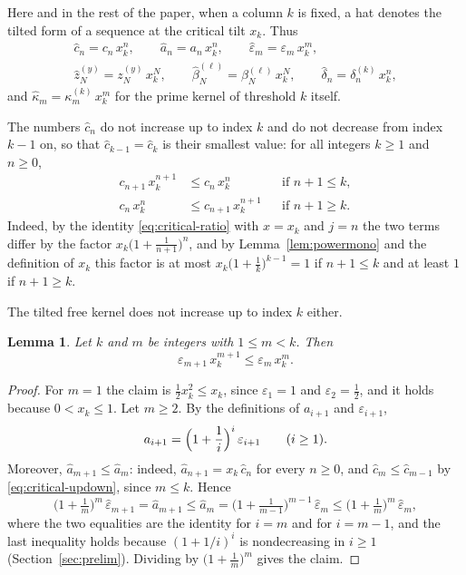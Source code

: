 \documentclass{amsart}
\newtheorem{lemma}[theorem]{Lemma}
\theoremstyle{definition}
\theoremstyle{remark}
\numberwithin{equation}{section}
\begin{document}
Here and in the rest of the paper, when a column $k$ is fixed, a hat denotes the tilted form of a sequence at the critical tilt $x_k$. Thus
\begin{gather*}
\hat c_n=c_n\,x_k^{n},\qquad \hat a_n=a_n\,x_k^{n},\qquad \hat\varepsilon_m=\varepsilon_m\,x_k^{m},\\
\hat z^{(y)}_N=z^{(y)}_N\,x_k^{N},\qquad \hat\beta^{(\ell)}_N=\beta^{(\ell)}_N\,x_k^{N},\qquad \hat\delta_n=\delta^{(k)}_n\,x_k^{n},
\end{gather*}
and $\hat\kappa_m=\kappa^{(k)}_m\,x_k^{m}$ for the prime kernel of threshold $k$ itself.

The numbers $\hat c_n$ do not increase up to index $k$ and do not decrease from index $k-1$ on, so that $\hat c_{k-1}=\hat c_k$ is their smallest value: for all integers $k\ge 1$ and $n\ge 0$,
\begin{equation}\label{eq:critical-updown}
\begin{aligned}
c_{n+1}\,x_k^{n+1}&\le c_n\,x_k^{n}&&\text{if } n+1\le k,\\
c_n\,x_k^{n}&\le c_{n+1}\,x_k^{n+1}&&\text{if } n+1\ge k.
\end{aligned}
\end{equation}
Indeed, by the identity \eqref{eq:critical-ratio} with $x=x_k$ and $j=n$ the two terms differ by the factor $x_k\bigl(1+\frac1{n+1}\bigr)^{n}$, and by Lemma~\ref{lem:powermono} and the definition of $x_k$ this factor is at most $x_k\bigl(1+\frac1k\bigr)^{k-1}=1$ if $n+1\le k$ and at least $1$ if $n+1\ge k$.

The tilted free kernel does not increase up to index $k$ either.

\begin{lemma}\label{lem:epsdown}
Let $k$ and $m$ be integers with $1\le m<k$. Then
\[
\varepsilon_{m+1}\,x_k^{m+1}\le\varepsilon_m\,x_k^{m}.
\]
\end{lemma}

\begin{proof}
For $m=1$ the claim is $\frac12x_k^2\le x_k$, since $\varepsilon_1=1$ and $\varepsilon_2=\frac12$, and it holds because $0<x_k\le 1$. Let $m\ge 2$. By the definitions of $a_{i+1}$ and $\varepsilon_{i+1}$,
\[
a_{i+1}=\Bigl(1+\frac1i\Bigr)^{i}\,\varepsilon_{i+1}\qquad(i\ge 1).
\]
Moreover, $\hat a_{m+1}\le\hat a_m$: indeed, $\hat a_{n+1}=x_k\,\hat c_n$ for every $n\ge 0$, and $\hat c_m\le\hat c_{m-1}$ by \eqref{eq:critical-updown}, since $m\le k$. Hence
\[
\bigl(1+\tfrac1m\bigr)^{m}\,\hat\varepsilon_{m+1}=\hat a_{m+1}\le\hat a_m=\bigl(1+\tfrac1{m-1}\bigr)^{m-1}\,\hat\varepsilon_m\le\bigl(1+\tfrac1m\bigr)^{m}\,\hat\varepsilon_m,
\]
where the two equalities are the identity for $i=m$ and for $i=m-1$, and the last inequality holds because $(1+1/i)^{i}$ is nondecreasing in $i\ge 1$ (Section~\ref{sec:prelim}). Dividing by $\bigl(1+\frac1m\bigr)^{m}$ gives the claim.
\end{proof}
\end{document}

